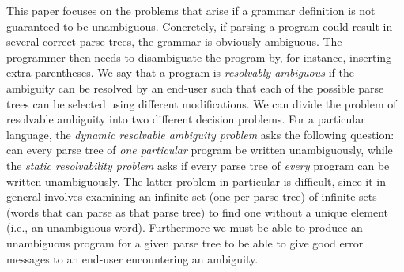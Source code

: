 \documentclass[runningheads]{llncs}
\begin{document}



This paper focuses on the problems that arise if a grammar definition
is not guaranteed to be unambiguous. Concretely, if parsing a program
could result in several correct parse trees, the grammar is obviously
ambiguous. The programmer then needs to disambiguate the program by,
for instance, inserting extra parentheses. We say that a program is
\emph{resolvably ambiguous} if the ambiguity can be resolved by
an end-user such that each of the possible parse trees can
be selected using different modifications.
%
We can divide the problem of resolvable ambiguity into two
different decision problems.
For a particular language, the \emph{dynamic resolvable ambiguity problem} asks the following question: can every parse tree of \emph{one particular} program be written unambiguously, while the \emph{static resolvability problem} asks if every parse tree of \emph{every} program can be written unambiguously. The latter problem in particular is difficult, since it in general involves examining an infinite set (one per parse tree) of infinite sets (words that can parse as that parse tree) to find one without a unique element (i.e., an unambiguous word). Furthermore we must be able to produce an unambiguous program for a given parse tree to be able to give good error messages to an end-user encountering an ambiguity.
\end{document}
